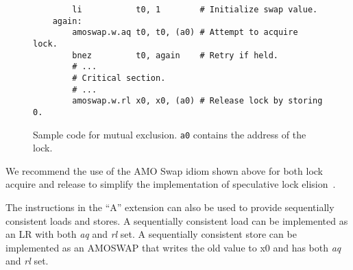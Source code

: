 \begin{figure}[h!]
\begin{center}
\begin{verbatim}
        li           t0, 1        # Initialize swap value.
    again:
        amoswap.w.aq t0, t0, (a0) # Attempt to acquire lock.
        bnez         t0, again    # Retry if held.
        # ...
        # Critical section.
        # ...
        amoswap.w.rl x0, x0, (a0) # Release lock by storing 0.
\end{verbatim}
\end{center}
\caption{Sample code for mutual exclusion.  {\tt a0} contains the address of the lock.}
\label{critical}
\end{figure}

\begin{commentary}
We recommend the use of the AMO Swap idiom shown above for both lock
acquire and release to simplify the implementation of speculative lock
elision~\cite{Rajwar:2001:SLE}.
\end{commentary}

The instructions in the ``A'' extension can also be used to provide
sequentially consistent loads and stores.  A sequentially consistent load can
be implemented as an LR with both {\em aq} and {\em rl} set. A sequentially
consistent store can be implemented as an AMOSWAP that writes the old value to
x0 and has both {\em aq} and {\em rl} set.
